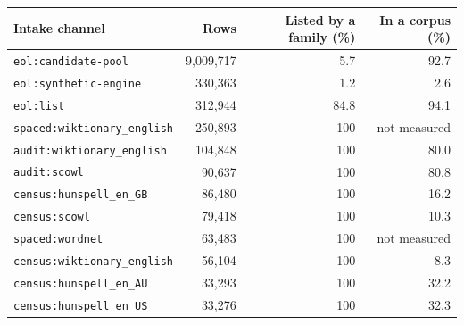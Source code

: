 \begin{tabular}{lrrr}
\toprule
Intake channel & Rows & Listed by a family (\%) & In a corpus (\%) \\
\midrule
\texttt{eol:candidate-pool} & 9,009,717 & 5.7 & 92.7 \\
\texttt{eol:synthetic-engine} & 330,363 & 1.2 & 2.6 \\
\texttt{eol:list} & 312,944 & 84.8 & 94.1 \\
\texttt{spaced:wiktionary\_english} & 250,893 & 100 & not measured \\
\texttt{audit:wiktionary\_english} & 104,848 & 100 & 80.0 \\
\texttt{audit:scowl} & 90,637 & 100 & 80.8 \\
\texttt{census:hunspell\_en\_GB} & 86,480 & 100 & 16.2 \\
\texttt{census:scowl} & 79,418 & 100 & 10.3 \\
\texttt{spaced:wordnet} & 63,483 & 100 & not measured \\
\texttt{census:wiktionary\_english} & 56,104 & 100 & 8.3 \\
\texttt{census:hunspell\_en\_AU} & 33,293 & 100 & 32.2 \\
\texttt{census:hunspell\_en\_US} & 33,276 & 100 & 32.3 \\
\bottomrule
\end{tabular}
